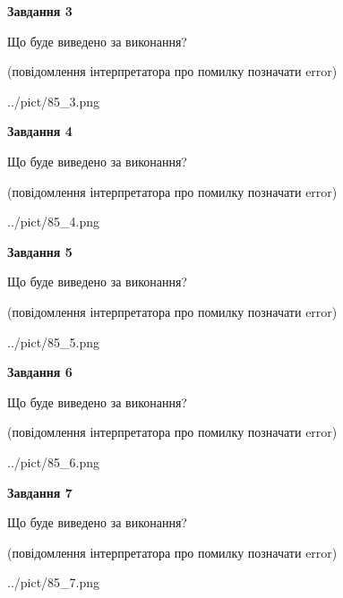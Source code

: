 \documentclass[12pt, ukrainian]{article}
\begin{document}
{\begin {large}
{\begin {center}\textbf{Завдання 3}\end {center}}\par
Що буде виведено за виконання?\par
 (повідомлення інтерпретатора про помилку позначати error)\par
\begin{center}
	{../pict/85_3.png}
\end{center}
\newpage

{\begin {center}\textbf{Завдання 4}\end {center}}\par
Що буде виведено за виконання?\par
 (повідомлення інтерпретатора про помилку позначати error)\par
\begin{center}
	{../pict/85_4.png}
\end{center}
\newpage

{\begin {center}\textbf{Завдання 5}\end {center}}\par
Що буде виведено за виконання?\par
 (повідомлення інтерпретатора про помилку позначати error)\par
\begin{center}
	{../pict/85_5.png}
\end{center}
\newpage

{\begin {center}\textbf{Завдання 6}\end {center}}\par
Що буде виведено за виконання?\par
 (повідомлення інтерпретатора про помилку позначати error)\par
\begin{center}
	{../pict/85_6.png}
\end{center}
\newpage

{\begin {center}\textbf{Завдання 7}\end {center}}\par
Що буде виведено за виконання?\par
 (повідомлення інтерпретатора про помилку позначати error)\par
\begin{center}
	{../pict/85_7.png}
\end{center}
\newpage


\end{large}}
\end{document}
